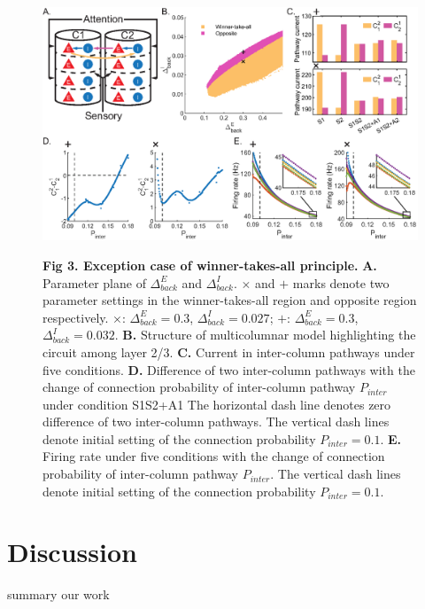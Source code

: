 \documentclass[10pt,letterpaper]{article}
\begin{document}
\begin{figure}[!h]
\begin{adjustwidth}{-2in}{0.3in} %
\centering
\includegraphics{Figure3.eps}
\begin{flushleft} {\bf Fig 3. Exception case of winner-takes-all principle.}
\textbf{A.} Parameter plane of $\Delta_{back}^{E}$ and $\Delta_{back}^{I}$. $\times$ and $+$ marks denote two parameter settings in the winner-takes-all region and opposite region respectively. $\times$: $\Delta_{back}^{E}=0.3$, $\Delta_{back}^{I}=0.027$; $+$: $\Delta_{back}^{E}=0.3$, $\Delta_{back}^{I}=0.032$. \textbf{B.} Structure of multicolumnar model highlighting the circuit among layer 2/3. \textbf{C.} Current in inter-column pathways under five conditions. \textbf{D.} Difference of two inter-column pathways with the change of connection probability of inter-column pathway $P_{inter}$ under condition S1S2+A1 The horizontal dash line denotes zero difference of two inter-column pathways. The vertical dash lines denote initial setting of the connection probability $P_{inter}=0.1$. \textbf{E.} Firing rate under five conditions with the change of connection probability of inter-column pathway $P_{inter}$. The vertical dash lines denote initial setting of the connection probability $P_{inter}=0.1$.
\end{flushleft}
\hypertarget{fig:fig3}{}
\end{adjustwidth}
\end{figure}

\section*{Discussion}
summary our work
\end{document}
